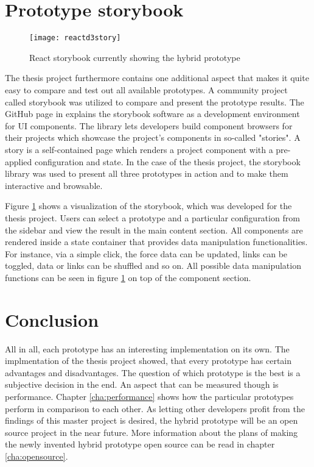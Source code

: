 \section{Prototype storybook}

\begin{figure}
  \centering
  \texttt{[image: reactd3story]}
  \caption{React storybook currently showing the hybrid prototype}
  \label{fig:reactD3stroy}
\end{figure}

The thesis project furthermore contains one additional aspect that makes it quite easy to compare and test out all available prototypes. A community project called storybook was utilized to compare and present the prototype results. The GitHub page in \cite{ReactStorybook} explains the storybook software as a development environment for UI components. The library lets developers build component browsers for their projects which showcase the project's components in so-called "stories". A story is a self-contained page which renders a project component with a pre-applied configuration and state. In the case of the thesis project, the storybook library was used to present all three prototypes in action and to make them interactive and browsable. 

Figure \ref{fig:reactD3stroy} shows a visualization of the storybook, which was developed for the thesis project. Users can select a prototype and a particular configuration from the sidebar and view the result in the main content section. All components are rendered inside a state container that provides data manipulation functionalities. For instance, via a simple click, the force data can be updated, links can be toggled, data or links can be shuffled and so on. All possible data manipulation functions can be seen in figure \ref{fig:reactD3stroy} on top of the component section.

\section{Conclusion}

All in all, each prototype has an interesting implementation on its own. The implmentation of the thesis project showed, that every prototype has certain advantages and disadvantages. The question of which prototype is the best is a subjective decision in the end. An aspect that can be measured though is performance. Chapter \ref{cha:performance} shows how the particular prototypes perform in comparison to each other. As letting other developers profit from the findings of this master project is desired, the hybrid prototype will be an open source project in the near future. More information about the plans of making the newly invented hybrid prototype open source can be read in chapter \ref{cha:opensource}.

